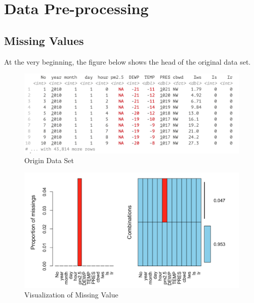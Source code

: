 
\chapter{Data Pre-processing} %

\label{Chapter2} %

\section{Missing Values}

At the very beginning, the figure below shows the head of the original data set.

\begin{figure}[htbp!]
\centering
\includegraphics[width=1.0\textwidth]{Figures/origindata.png}
\caption[Figures/origindata.png]{Origin Data Set}
\label{fig:Origin data Set}
\end{figure}

\begin{figure}[htbp!]
\centering
\includegraphics[width=1.0\textwidth]{Figures/missing.png}
\caption[Figures/missing.png]{Visualization of Missing Value}
\label{fig:missing}
\end{figure}

